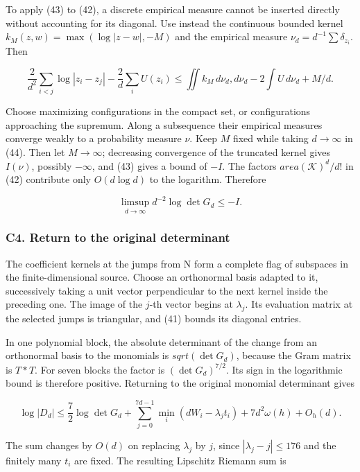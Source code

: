 \documentclass[11pt,a4paper]{article}
\begin{document}
To apply (43) to (42), a discrete empirical measure cannot be inserted directly without accounting for its diagonal. Use instead the continuous bounded kernel \(k_M(z,w)=\operatorname{max}(\operatorname{log}|z-w|,-M)\) and the empirical measure \(ν_d=d^{-1}\sum δ_{z_i}\). Then

\[
\frac{2}{d^2}\sum_{i<j}\log|z_i-z_j|-\frac2d\sum_iU(z_i)
\le\iint k_M\,d\nu_d,d\nu_d-2\int U\,d\nu_d+M/d.\tag{44}
\]

Choose maximizing configurations in the compact set, or configurations approaching the supremum. Along a subsequence their empirical measures converge weakly to a probability measure \(ν\). Keep \(M\) fixed while taking \(d→∞\) in (44). Then let \(M→∞\); decreasing convergence of the truncated kernel gives \(I(ν)\), possibly \(-∞\), and (43) gives a bound of \(-I\). The factors \(area(\mathcal{K})^d/d!\) in (42) contribute only \(O(d \operatorname{log} d)\) to the logarithm. Therefore

\[
\limsup_{d\to\infty}d^{-2}\log\det G_d\le-I.\tag{45}
\]

\hypertarget{c4.-return-to-the-original-determinant}{%
\subsubsection{C4. Return to the original determinant}\label{c4.-return-to-the-original-determinant}}

The coefficient kernels at the jumps from N form a complete flag of subspaces in the finite-dimensional source. Choose an orthonormal basis adapted to it, successively taking a unit vector perpendicular to the next kernel inside the preceding one. The image of the \(j\)-th vector begins at \(λ_j\). Its evaluation matrix at the selected jumps is triangular, and (41) bounds its diagonal entries.

In one polynomial block, the absolute determinant of the change from an orthonormal basis to the monomials is \(sqrt(\operatorname{det} G_d)\), because the Gram matrix is \(T* T\). For seven blocks the factor is \((\operatorname{det} G_d)^{7/2}\). Its sign in the logarithmic bound is therefore positive. Returning to the original monomial determinant gives

\[
\log|D_d|\le\frac72\log\det G_d+
\sum_{j=0}^{7d-1}\min_i(dW_i-\lambda_jt_i)
+7d^2\omega(h)+O_h(d).\tag{46}
\]

The sum changes by \(O(d)\) on replacing \(λ_j\) by \(j\), since \(|λ_j-j|≤176\) and the finitely many \(t_i\) are fixed. The resulting Lipschitz Riemann sum is
\end{document}
